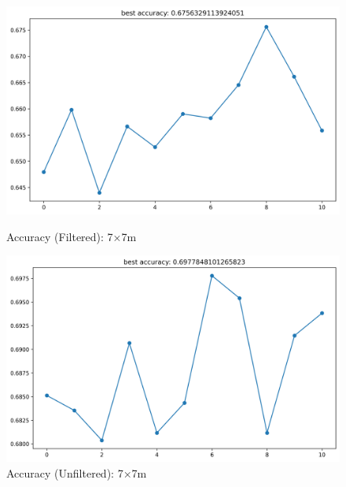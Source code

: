\documentclass[runningheads]{llncs}
\begin{document}
\begin{figure}[H]
	\centering
	\begin{minipage}{0.49\textwidth}
		\centering
		\includegraphics[width=\textwidth]{figures/filtered/mlp_acc_7.png}
		\caption*{Accuracy (Filtered): 7×7m}
	\end{minipage}
	\hfill
	\begin{minipage}{0.49\textwidth}
		\centering
		\includegraphics[width=\textwidth]{figures/unfiltered/mlp_acc_7.png}
		\caption*{Accuracy (Unfiltered): 7×7m}
	\end{minipage}
\end{figure}
\end{document}
